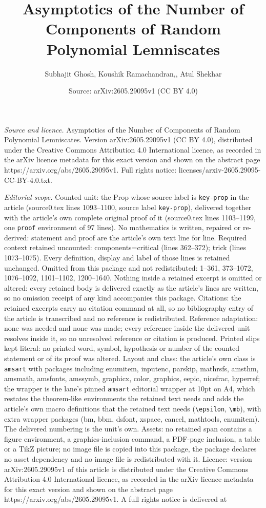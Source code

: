\documentclass[10pt,a4paper]{amsart}
\title[Asymptotics of the Number of Components of Random Polynomial]{Asymptotics of the Number of Components of Random Polynomial Lemniscates}
\author{Subhajit Ghosh, Koushik Ramachandran,, Atul Shekhar}
\date{Source: arXiv:2605.29095v1 (CC BY 4.0)}
\begin{document}
\maketitle

\noindent\emph{Source and licence.} Asymptotics of the Number of Components of Random Polynomial Lemniscates. Version arXiv:2605.29095v1 (CC BY 4.0), distributed under the Creative Commons Attribution 4.0 International licence, as recorded in the arXiv licence metadata for this exact version and shown on the abstract page https://arxiv.org/abs/2605.29095v1. Full rights notice: licenses/arxiv-2605.29095-CC-BY-4.0.txt.\par\smallskip

\noindent\textit{Editorial scope.} Counted unit: the Prop whose source label is \texttt{key-prop} in the article (source0.tex lines 1093--1100, source label \texttt{key-prop}), delivered together with the article's own complete original proof of it (source0.tex lines 1103--1199, one \texttt{proof} environment of 97 lines). No mathematics is written, repaired or re-derived: statement and proof are the article's own text line for line. Required context retained uncounted: components=critical (lines 362--372); trick (lines 1073--1075). Every definition, display and label of those lines is retained unchanged. Omitted from this package and not redistributed: 1--361, 373--1072, 1076--1092, 1101--1102, 1200--1640. Nothing inside a retained excerpt is omitted or altered: every retained body is delivered exactly as the article's lines are written, so no omission receipt of any kind accompanies this package. Citations: the retained excerpts carry no citation command at all, so no bibliography entry of the article is transcribed and no reference is redistributed. Reference adaptation: none was needed and none was made; every reference inside the delivered unit resolves inside it, so no unresolved reference or citation is produced. Printed slips kept literal: no printed word, symbol, hypothesis or number of the counted statement or of its proof was altered. Layout and class: the article's own class is \texttt{amsart} with packages including enumitem, inputenc, parskip, mathrsfs, amsthm, amsmath, amsfonts, amssymb, graphicx, color, graphics, eepic, nicefrac, hyperref; the wrapper is the lane's pinned \texttt{amsart} editorial wrapper at 10pt on A4, which restates the theorem-like environments the retained text needs and adds the article's own macro definitions that the retained text needs (\texttt{\textbackslash epsilon}, \texttt{\textbackslash mb}), with extra wrapper packages (bm, bbm, dsfont, xspace, cancel, mathtools, enumitem). The delivered numbering is the unit's own. Assets: no retained span contains a figure environment, a graphics-inclusion command, a PDF-page inclusion, a table or a TikZ picture; no image file is copied into this package, the package declares no asset dependency and no image file is redistributed with it. Licence: version arXiv:2605.29095v1 of this article is distributed under the Creative Commons Attribution 4.0 International licence, as recorded in the arXiv licence metadata for this exact version and shown on the abstract page https://arxiv.org/abs/2605.29095v1. A full rights notice is delivered at 
\end{document}

